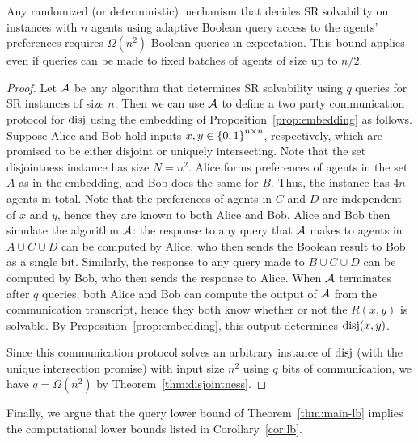 \begin{thm}\label{thm:main-lb}
    Any randomized (or deterministic) mechanism that decides SR solvability on instances with $n$ agents using adaptive Boolean query access to the agents' preferences requires $\Omega(n^2)$ Boolean queries in expectation. This bound applies even if queries can be made to fixed batches of agents of size up to $n/2$.
\end{thm}
\begin{proof}
    Let $\mathcal{A}$ be any algorithm that determines SR solvability using $q$ queries for SR instances of size $n$. Then we can use $\mathcal{A}$ to define a two party communication protocol for $\operatorname{disj}$ using the embedding of Proposition~\ref{prop:embedding} as follows. Suppose Alice and Bob hold inputs $x, y \in \left\{0,1\right\}^{n \times n}$, respectively, which are promised to be either disjoint or uniquely intersecting. Note that the set disjointness instance has size $N = n^2$. Alice forms preferences of agents in the set $A$ as in the embedding, and Bob does the same for $B$. Thus, the instance has $4n$ agents in total. Note that the preferences of agents in $C$ and $D$ are independent of $x$ and $y$, hence they are known to both Alice and Bob. Alice and Bob then simulate the algorithm $\mathcal{A}$: the response to any query that $\mathcal{A}$ makes to agents in $A \cup C \cup D$ can be computed by Alice, who then sends the Boolean result to Bob as a single bit. Similarly, the response to any query made to $B \cup C \cup D$ can be computed by Bob, who then sends the response to Alice. When $\mathcal{A}$ terminates after $q$ queries, both Alice and Bob can compute the output of $\mathcal{A}$ from the communication transcript, hence they both know whether or not the $R(x, y)$ is solvable. By Proposition~\ref{prop:embedding}, this output determines $\operatorname{disj}(x, y)$.

    Since this communication protocol solves an arbitrary instance of $\operatorname{disj}$ (with the unique intersection promise) with input size $n^2$ using $q$ bits of communication, we have $q = \Omega(n^2)$ by Theorem~\ref{thm:disjointness}.
\end{proof}

Finally, we argue that the query lower bound of Theorem~\ref{thm:main-lb} implies the computational lower bounds listed in Corollary~\ref{cor:lb}.

